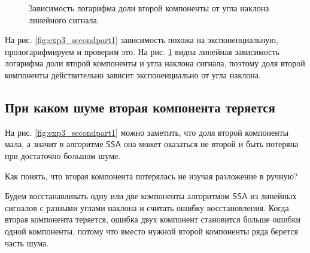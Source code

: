 \documentclass[specialist, substylefile = spbureport.rtx,
    subf,href,colorlinks=true, 12pt]{disser}
\newcommand{\SSA}{\mathsf{SSA}}
\begin{document}
\begin{figure}[h]
\begin{minipage}{.45\textwidth}
            \caption{Зависимость логарифма доли второй компоненты от угла наклона линейного сигнала.}
            \label{fig:exp3_secondpart2}
            \end{minipage}
        \end{figure}



        На рис. \ref{fig:exp3_secondpart1} зависимость похожа на экспоненциальную, прологарифмируем и проверим это.
        На рис. \ref{fig:exp3_secondpart2} видна линейная зависимость логарифма доли второй компоненты и угла наклона сигнала, поэтому доля второй компоненты действительно зависит экспоненциально от угла наклона.

    \subsection{При каком шуме вторая компонента теряется}
        На рис. \ref{fig:exp3_secondpart1} можно заметить, что доля второй компоненты мала, а значит в алгоритме $\SSA$ она может оказаться не второй и быть потеряна при достаточно большом шуме.

        Как понять, что вторая компонента потерялась не изучая разложение в ручную?
        
        Будем восстанавливать одну или две компоненты алгоритмом $\SSA$ из линейных сигналов с разными углами наклона и считать ошибку восстановления. Когда вторая компонента теряется, ошибка двух компонент становится больше ошибки одной компоненты, потому что вместо нужной второй компоненты ряда берется часть шума.
        
\end{document}
